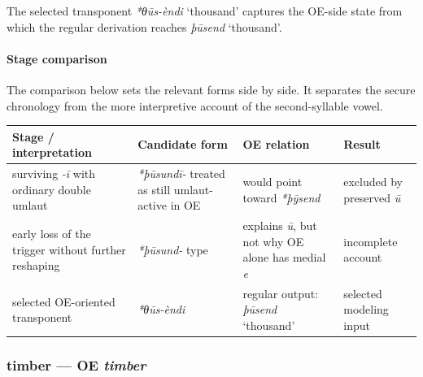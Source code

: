 \documentclass[
  british,
  a4paper,
]{article}
\newcounter{none} %
\providecommand{\Recon}[1]{\emph{*#1}}
\begin{document}
The selected transponent \Recon{θūs-èndi} `thousand' captures the
OE-side state from which the regular derivation reaches {\emph{þūsend}}
`thousand'.

\paragraph{Stage comparison}\label{stage-comparison-1}

The comparison below sets the relevant forms side by side. It separates
the secure chronology from the more interpretive account of the
second-syllable vowel.

{\def\LTcaptype{none} %
\begin{longtable}[]{@{}
  >{\raggedright\arraybackslash}p{}
  >{\raggedright\arraybackslash}p{}
  >{\raggedright\arraybackslash}p{}
  >{\raggedright\arraybackslash}p{}@{}}
\toprule\noalign{}
\begin{minipage}[b]{\linewidth}\raggedright
Stage / interpretation
\end{minipage} & \begin{minipage}[b]{\linewidth}\raggedright
Candidate form
\end{minipage} & \begin{minipage}[b]{\linewidth}\raggedright
OE relation
\end{minipage} & \begin{minipage}[b]{\linewidth}\raggedright
Result
\end{minipage} \\
\midrule\noalign{}
\endhead
\bottomrule\noalign{}
\endlastfoot
surviving \emph{-ī} with ordinary double umlaut & {\emph{*þūsundī-}}
treated as still umlaut-active in OE & would point toward
{\emph{*þȳsend}} & excluded by preserved \emph{ū} \\
early loss of the trigger without further reshaping & \emph{*þūsund-}
type & explains \emph{ū}, but not why OE alone has medial \emph{e} &
incomplete account \\
selected OE-oriented transponent & {\emph{*θūs-èndi}} & regular output:
{\emph{þūsend}} `thousand' & selected modeling input \\
\end{longtable}
}

\subsubsection{\texorpdfstring{timber --- OE
\emph{timber}}{timber --- OE timber}}\label{timber-oe-timber}
\end{document}
